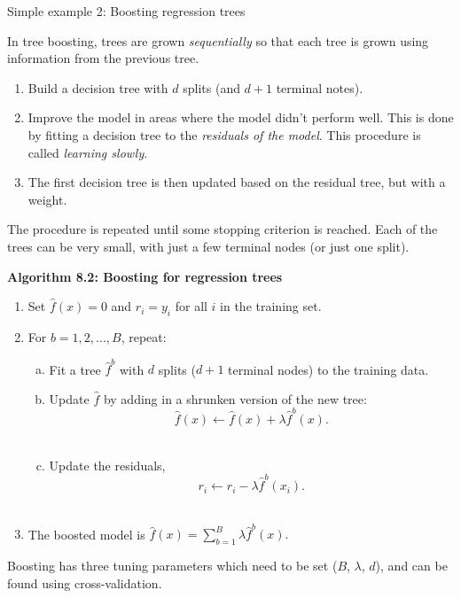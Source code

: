 \documentclass[
  10pt,
  ignorenonframetext,
]{beamer}
\providecommand{\tightlist}{%
  \setlength{\itemsep}{0pt}\setlength{\parskip}{0pt}}
\begin{document}
\begin{frame}{Simple example 2: Boosting regression trees}
\protect\hypertarget{simple-example-2-boosting-regression-trees}{}
\(~\)

In tree boosting, trees are grown \emph{sequentially} so that each tree
is grown using information from the previous tree.

\begin{enumerate}
\tightlist
\item
  Build a decision tree with \(d\) splits (and \(d+1\) terminal notes).
\item
  Improve the model in areas where the model didn't perform well. This
  is done by fitting a decision tree to the \emph{residuals of the
  model}. This procedure is called \emph{learning slowly}.
\item
  The first decision tree is then updated based on the residual tree,
  but with a weight.
\end{enumerate}

The procedure is repeated until some stopping criterion is reached. Each
of the trees can be very small, with just a few terminal nodes (or just
one split).
\end{frame}

\begin{frame}
\textbf{Algorithm 8.2: Boosting for regression trees}

\begin{enumerate}
\tightlist
\item
  Set \(\hat{f}(x) = 0\) and \(r_i = y_i\) for all \(i\) in the training
  set.
\item
  For \(b=1,2,...,B\), repeat:

  \begin{enumerate}
  [a)]
  \tightlist
  \item
    Fit a tree \(\hat{f}^b\) with \(d\) splits (\(d+1\) terminal nodes)
    to the training data.\\
  \item
    Update \(\hat{f}\) by adding in a shrunken version of the new tree:
    \[\hat{f}(x) \leftarrow \hat{f}(x)+\lambda \hat{f}^b(x).\]\\
  \item
    Update the residuals,
    \[r_i \leftarrow r_i - \lambda \hat{f}^b(x_i).\]\\
  \end{enumerate}
\item
  The boosted model is
  \(\hat{f}(x) = \sum_{b=1}^B \lambda \hat{f}^b(x).\)
\end{enumerate}

Boosting has three tuning parameters which need to be set (\(B\),
\(\lambda\), \(d\)), and can be found using cross-validation.
\end{frame}
\end{document}
